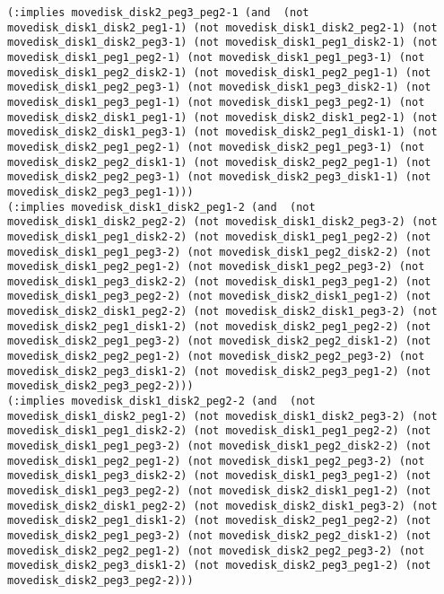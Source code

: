 \documentclass[12pt,letterpaper]{ntdhw}
\begin{document}
\begin{enumerate}
\begin{enumerate}
\begin{lstlisting}[language=pddl, style=pddlstyle,
  basicstyle=\scriptsize]
(:implies movedisk_disk2_peg3_peg2-1 (and  (not movedisk_disk1_disk2_peg1-1) (not movedisk_disk1_disk2_peg2-1) (not movedisk_disk1_disk2_peg3-1) (not movedisk_disk1_peg1_disk2-1) (not movedisk_disk1_peg1_peg2-1) (not movedisk_disk1_peg1_peg3-1) (not movedisk_disk1_peg2_disk2-1) (not movedisk_disk1_peg2_peg1-1) (not movedisk_disk1_peg2_peg3-1) (not movedisk_disk1_peg3_disk2-1) (not movedisk_disk1_peg3_peg1-1) (not movedisk_disk1_peg3_peg2-1) (not movedisk_disk2_disk1_peg1-1) (not movedisk_disk2_disk1_peg2-1) (not movedisk_disk2_disk1_peg3-1) (not movedisk_disk2_peg1_disk1-1) (not movedisk_disk2_peg1_peg2-1) (not movedisk_disk2_peg1_peg3-1) (not movedisk_disk2_peg2_disk1-1) (not movedisk_disk2_peg2_peg1-1) (not movedisk_disk2_peg2_peg3-1) (not movedisk_disk2_peg3_disk1-1) (not movedisk_disk2_peg3_peg1-1)))
(:implies movedisk_disk1_disk2_peg1-2 (and  (not movedisk_disk1_disk2_peg2-2) (not movedisk_disk1_disk2_peg3-2) (not movedisk_disk1_peg1_disk2-2) (not movedisk_disk1_peg1_peg2-2) (not movedisk_disk1_peg1_peg3-2) (not movedisk_disk1_peg2_disk2-2) (not movedisk_disk1_peg2_peg1-2) (not movedisk_disk1_peg2_peg3-2) (not movedisk_disk1_peg3_disk2-2) (not movedisk_disk1_peg3_peg1-2) (not movedisk_disk1_peg3_peg2-2) (not movedisk_disk2_disk1_peg1-2) (not movedisk_disk2_disk1_peg2-2) (not movedisk_disk2_disk1_peg3-2) (not movedisk_disk2_peg1_disk1-2) (not movedisk_disk2_peg1_peg2-2) (not movedisk_disk2_peg1_peg3-2) (not movedisk_disk2_peg2_disk1-2) (not movedisk_disk2_peg2_peg1-2) (not movedisk_disk2_peg2_peg3-2) (not movedisk_disk2_peg3_disk1-2) (not movedisk_disk2_peg3_peg1-2) (not movedisk_disk2_peg3_peg2-2)))
(:implies movedisk_disk1_disk2_peg2-2 (and  (not movedisk_disk1_disk2_peg1-2) (not movedisk_disk1_disk2_peg3-2) (not movedisk_disk1_peg1_disk2-2) (not movedisk_disk1_peg1_peg2-2) (not movedisk_disk1_peg1_peg3-2) (not movedisk_disk1_peg2_disk2-2) (not movedisk_disk1_peg2_peg1-2) (not movedisk_disk1_peg2_peg3-2) (not movedisk_disk1_peg3_disk2-2) (not movedisk_disk1_peg3_peg1-2) (not movedisk_disk1_peg3_peg2-2) (not movedisk_disk2_disk1_peg1-2) (not movedisk_disk2_disk1_peg2-2) (not movedisk_disk2_disk1_peg3-2) (not movedisk_disk2_peg1_disk1-2) (not movedisk_disk2_peg1_peg2-2) (not movedisk_disk2_peg1_peg3-2) (not movedisk_disk2_peg2_disk1-2) (not movedisk_disk2_peg2_peg1-2) (not movedisk_disk2_peg2_peg3-2) (not movedisk_disk2_peg3_disk1-2) (not movedisk_disk2_peg3_peg1-2) (not movedisk_disk2_peg3_peg2-2)))

\end{lstlisting}
\end{enumerate}
\end{enumerate}
\end{document}
